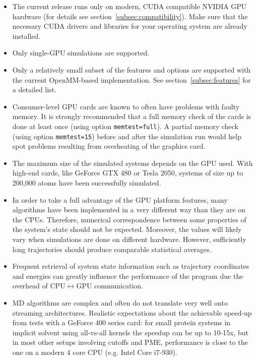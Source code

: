 \begin{itemize}
\item The current release runs only on modern, CUDA compatible NVIDIA GPU hardware 
(for details see section~\ref{subsec:compatibility}). Make sure that the necessary CUDA drivers and 
libraries for your operating system are already installed. 
\item Only single-GPU simulations are supported.
\item Only a relatively small subset of the {\gromacs} features and options are supported 
with the  current OpenMM-based implementation. See section~\ref{subsec:features} for 
a detailed list.
\item Consumer-level GPU cards are known to often have problems with faulty memory.
It is strongly recommended that a full memory check of the cards is done at least once
(using option {\tt memtest=full}). A partial memory check (using option {\tt memtest=15}) 
before and after the simulation run would help spot problems resulting from overheating 
of the graphics card.
\item The maximum size of the simulated systems depends on the GPU used. With
high-end cards, like GeForce GTX 480 or Tesla 2050, systems of size up to 200,000 atoms 
have been successfully simulated.
\item In order to take a full advantage of the GPU platform features, many algorithms
have been implemented in a very different way than they are on the CPUs.
Therefore, numerical correspondence between some properties of the system's state
should not be expected. Moreover, the values will likely vary when simulations are
done on different hardware. However, sufficiently long trajectories
should produce comparable statistical averages.
\item Frequent retrieval of system state information such as
trajectory coordinates and energies can greatly influence the performance
of the program due the overhead of CPU$\leftrightarrow$GPU communication.
\item MD algorithms are complex and often do not translate very well onto streaming architectures.
Realistic expectations about the achievable speed-up from tests with a GeForce 400 series card:
for small protein systems in implicit solvent using all-vs-all kernels the speedup 
can be up to 10-15x, but in most other setups involving cutoffs and PME, 
performance is close to the one on a modern 4 core CPU (e.g. Intel Core i7-930).
\end{itemize}

